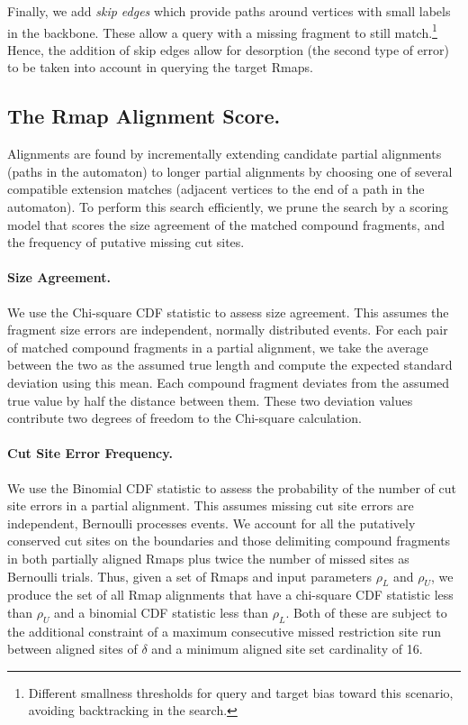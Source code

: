 \documentclass[doctor]{thesis}
\begin{document}
Finally, we add {\em skip edges} which provide paths around vertices with small labels in the backbone.
These allow a query with a missing fragment to still match.\footnote{Different smallness thresholds for query and target bias toward this scenario, avoiding backtracking in the search.}  Hence, the addition of skip edges allow for desorption (the second type of error) to be taken into account in querying the target Rmaps.  



\subsection{The Rmap Alignment Score.}

Alignments are found by incrementally extending candidate partial alignments (paths in the automaton) to longer partial alignments by choosing one of several compatible extension matches (adjacent vertices to the end of a path in the automaton).  To perform this search efficiently, we prune the search by a scoring model that scores the size agreement of the matched compound fragments, and the frequency of putative missing cut sites.

\paragraph{Size Agreement.}
We use the Chi-square CDF statistic to assess size agreement.  This assumes the fragment size errors are independent, normally distributed events.  For each pair of matched compound fragments in a partial alignment, we take the average between the two as the assumed true length and
compute the expected standard deviation using this mean.  Each compound fragment deviates from the assumed true value by half the distance between them.  These two deviation values contribute two degrees of freedom to the Chi-square calculation.

\paragraph{Cut Site Error Frequency.}
We use the Binomial CDF statistic to assess the probability of the number of cut site errors in a partial alignment.   This assumes missing cut site errors are independent, Bernoulli processes events.  We account for all the putatively conserved cut sites on the boundaries and those delimiting compound fragments in both partially aligned Rmaps plus twice the number of missed sites as Bernoulli trials. 
Thus, given a set of Rmaps and input parameters $\rho_{L}$ and $\rho_{U}$, we produce the set of all Rmap alignments that have a chi-square CDF statistic less than $\rho_U$ and a binomial CDF statistic less than $\rho_L$.  Both of these are subject to the additional constraint of a maximum consecutive missed restriction site run between aligned sites of $\delta$ and a minimum aligned site set cardinality of 16. 
\end{document}
